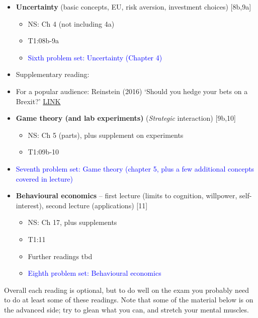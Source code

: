 \documentclass[]{article}
\providecommand{\tightlist}{%
  \setlength{\itemsep}{0pt}\setlength{\parskip}{0pt}}
\begin{document}
\begin{itemize}
\item
  \textbf{Uncertainty} (basic concepts, EU, risk aversion, investment
  choices) {[}8b,9a{]}

  \begin{itemize}
  \item
    NS: Ch 4 (not including 4a)
  \item
    T1:08b-9a
  \item
    \textcolor{blue}{Sixth problem set: Uncertainty (Chapter 4)}
  \end{itemize}
\item
  Supplementary reading:
\item
  For a popular audience: Reinstein (2016) `Should you hedge your bets
  on a Brexit?'
  \href{https://davidreinstein.wordpress.com/2016/06/19/should-you-hedge-your-bets-on-a-brexit/}{LINK}
\item
  \textbf{Game theory (and lab experiments)} (\emph{Strategic}
  interaction) {[}9b,10{]}

  \begin{itemize}
  \tightlist
  \item
    NS: Ch 5 (parts), plus supplement on experiments
  \item
    T1:09b-10
  \end{itemize}
\item
  \textcolor{blue}{Seventh problem set: Game theory (chapter 5, plus a few additional concepts covered in lecture)}
\item
  \textbf{Behavioural economics} -- first lecture (limits to cognition,
  willpower, self-interest), second lecture (applications) {[}11{]}

  \begin{itemize}
  \tightlist
  \item
    NS: Ch 17, plus supplements
  \item
    T1:11
  \item
    Further readings tbd
  \item
    \textcolor{blue}{Eighth problem set: Behavioural economics}
  \end{itemize}
\end{itemize}

Overall each reading is optional, but to do well on the exam you
probably need to do at least some of these readings. Note that some of
the material below is on the advanced side; try to glean what you can,
and stretch your mental muscles.
\end{document}
